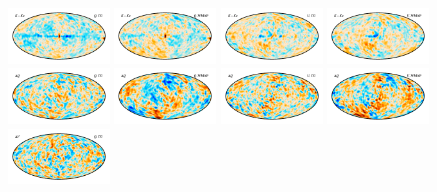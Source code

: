 \documentclass[twocolumn]{../../common/aa}
\begin{document}
\begin{figure}
	\centering
	\includegraphics[width=0.24\textwidth]{figures/KKa_deltaQ.pdf}
	\includegraphics[width=0.24\textwidth]{figures/KKa_W_deltaQ.pdf}
	\includegraphics[width=0.24\textwidth]{figures/KKa_deltaU.pdf}
	\includegraphics[width=0.24\textwidth]{figures/KKa_W_deltaU.pdf}\\
	\includegraphics[width=0.24\textwidth]{figures/Q_deltaQ.pdf}
	\includegraphics[width=0.24\textwidth]{figures/Q_W_deltaQ.pdf}
	\includegraphics[width=0.24\textwidth]{figures/Q_deltaU.pdf}
	\includegraphics[width=0.24\textwidth]{figures/Q_W_deltaU.pdf}\\
	\includegraphics[width=0.24\textwidth]{figures/V_deltaQ.pdf}

\end{figure}
\end{document}

